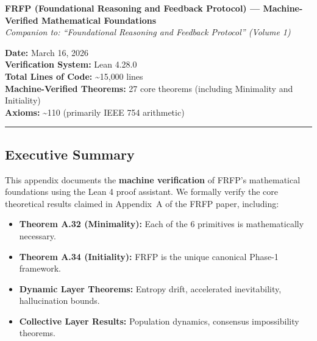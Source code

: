 \label{app:lean4-formal-verification}

\begin{center}
\textbf{FRFP (Foundational Reasoning and Feedback Protocol) --- Machine-Verified Mathematical Foundations}\\
\emph{Companion to: ``Foundational Reasoning and Feedback Protocol'' (Volume 1)}
\end{center}

\noindent\textbf{Date:} March 16, 2026\\
\textbf{Verification System:} Lean 4.28.0\\
\textbf{Total Lines of Code:} \textasciitilde 15{,}000 lines\\
\textbf{Machine-Verified Theorems:} 27 core theorems (including Minimality and Initiality)\\
\textbf{Axioms:} \textasciitilde 110 (primarily IEEE 754 arithmetic)

\hrule
\vspace{0.75\baselineskip}

\subsection{Executive Summary}
This appendix documents the \textbf{machine verification} of FRFP's mathematical foundations using the Lean 4 proof assistant. We formally verify the core theoretical results claimed in Appendix~A of the FRFP paper, including:
\begin{itemize}
  \item \textbf{Theorem A.32 (Minimality):} Each of the 6 primitives is mathematically necessary.
  \item \textbf{Theorem A.34 (Initiality):} FRFP is the unique canonical Phase-1 framework.
  \item \textbf{Dynamic Layer Theorems:} Entropy drift, accelerated inevitability, hallucination bounds.
  \item \textbf{Collective Layer Results:} Population dynamics, consensus impossibility theorems.
\end{itemize}

